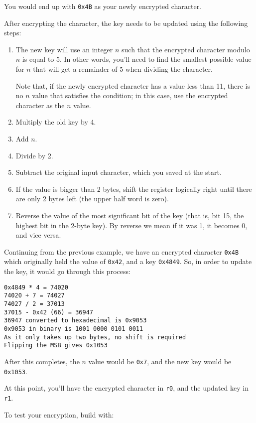 \documentclass{article}
\def\r#1{\texttt{r#1}}
\begin{document}
You would end up with {\tt 0x4B} as your newly encrypted character.\newline


After encrypting the character, the key needs to be updated using the 
following steps:

\begin{enumerate} \item The new key will use an integer $n$ such that the 
encrypted character modulo $n$ is equal to 5. In other words, you'll need 
to find the smallest possible value for $n$ that will get a remainder of 5 
when dividing the character. 

Note that, if the newly encrypted character has a value less than 11, there
is no $n$ value that satisfies the condition; in this case, use the encrypted
character as the $n$ value.
\item Multiply the old key by 4.
\item Add $n$.
\item Divide by 2.
\item Subtract the original input character, which you saved at the start.
\item If the value is bigger than 2 bytes, shift the register logically 
right until there are only 2 bytes left (the upper half word is zero).
\item Reverse the value of the most significant bit of the key (that is, bit
15, the highest bit in the 2-byte key). By reverse we mean if it was 1, it becomes 
0, and vice versa.
\end{enumerate}

Continuing from the previous example, we have an encrypted character 
{\tt 0x4B} which originally held the value of {\tt 0x42}, and a key 
{\tt 0x4849}. So, in order to update the key, it would go through this 
process:
\begin{verbatim}
0x4849 * 4 = 74020
74020 + 7 = 74027
74027 / 2 = 37013
37015 - 0x42 (66) = 36947
36947 converted to hexadecimal is 0x9053
0x9053 in binary is 1001 0000 0101 0011
As it only takes up two bytes, no shift is required
Flipping the MSB gives 0x1053
\end{verbatim}

After this completes, the $n$ value would be {\tt 0x7}, and the new key 
would be {\tt 0x1053}.


At this point, you'll have the encrypted character in \r{0}, and the updated
key in \r{1}.

To test your encryption, build with:
\end{document}
